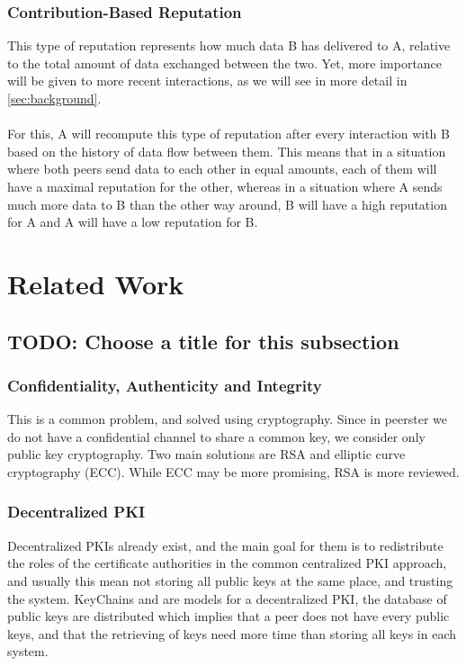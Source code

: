 \documentclass[]{article}
\begin{document}
\subsubsection{Contribution-Based Reputation}
This type of reputation represents how much data B has delivered to A, relative to the total amount of data exchanged between the two.
Yet, more importance will be given to more recent interactions, as we will see in more detail in \ref{sec:background}.
\\\\
For this, A will recompute this type of reputation after every interaction with B based on the history of data flow between them.
This means that in a situation where both peers send data to each other in equal amounts, each of them will have a maximal reputation for the other, whereas in a situation where A sends much more data to B than the other way around, B will have a high reputation for A and A will have a low reputation for B.

\section{Related Work}

\subsection{TODO: Choose a title for this subsection}

\subsubsection{Confidentiality, Authenticity and Integrity}
This is a common problem, and solved using cryptography. Since in peerster we do not have a confidential channel to share a common key, we consider only public key cryptography. Two main solutions are RSA \cite{RFC8017} and elliptic curve cryptography (ECC). While ECC may be more promising, RSA is more reviewed.

\subsubsection{Decentralized PKI}
Decentralized PKIs already exist, and the main goal for them is to redistribute the roles of the certificate authorities in the common centralized PKI approach, and usually this mean not storing all public keys at the same place, and trusting the system. KeyChains \cite{morselli2006keychains} and \cite{aberer2005decentralised} are models for a decentralized PKI, the database of public keys are distributed which implies that a peer does not have every public keys, and that the retrieving of keys need more time than storing all keys in each system.
\end{document}
